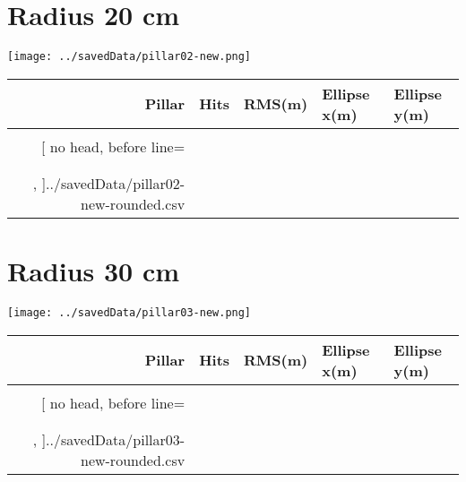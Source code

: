 \documentclass{article}
\begin{document}
\section{Radius 20 cm}
\begin{center}
\texttt{[image: ../savedData/pillar02-new.png]}

\begin{tabular}{r|llll}
	\toprule%
	\bfseries Pillar & \bfseries Hits & \bfseries RMS(m) & \bfseries Ellipse x(m) & \bfseries Ellipse y(m)\\\midrule\\[-0.8cm]
	\csvreader[%
	  no head,
	  before line=\ifthenelse{\equal{\csvcoli}{Average}}{\\\midrule}{\\},
	  late after last line = \\\bottomrule,
	]{../savedData/pillar02-new-rounded.csv}{}{%
	  \csvcoli&\csvcolii&\csvcoliii&\csvcoliv&\csvcolv
	}
\end{tabular}
\end{center}

\newpage


\section{Radius 30 cm}
\begin{center}
\texttt{[image: ../savedData/pillar03-new.png]}

\begin{tabular}{r|llll}
	\toprule%
	\bfseries Pillar & \bfseries Hits & \bfseries RMS(m) & \bfseries Ellipse x(m) & \bfseries Ellipse y(m)\\\midrule\\[-0.8cm]
	\csvreader[%
	  no head,
	  before line=\ifthenelse{\equal{\csvcoli}{Average}}{\\\midrule}{\\},
	  late after last line = \\\bottomrule,
	]{../savedData/pillar03-new-rounded.csv}{}{%
	  \csvcoli&\csvcolii&\csvcoliii&\csvcoliv&\csvcolv
	}
\end{tabular}
\end{center}
\end{document}
